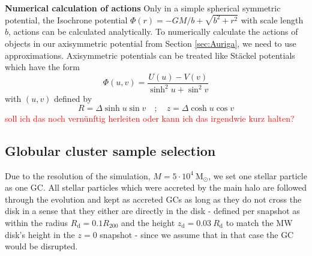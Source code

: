 \textbf{Numerical calculation of actions} Only in a simple spherical symmetric potential, the Isochrone potential $\Phi(r) = -GM/b + \sqrt{b^2+r^2}$ with scale length $b$, actions can be calculated analytically. To numerically calculate the actions of objects in our axisymmetric potential from Section \ref{sec:Auriga}, we need to use approximations. Axisymmetric potentials can be treated like St\"ackel potentials \citep{deZeeuw...Staeckel..1985} which have the form
\begin{equation}\label{eq:Stackel_pot}
    \Phi(u,v) = \frac{U(u)-V(v)}{\sinh^2u + \sin^2v}
\end{equation}
with $(u,v)$ defined by 
\begin{equation}
    R = \Delta \sinh{u} \sin{v}\quad ; \quad z = \Delta \cosh{u}\cos{v}
\end{equation}
\textcolor{red}{soll ich das noch vernünftig herleiten oder kann ich das irgendwie kurz halten?}

\subsection{Globular cluster sample selection}\label{subsec:GC_selection}
Due to the resolution of the simulation, $M = 5 \cdot 10 ^ 4\ \mathrm{M}_{\odot}$, we set one stellar particle as one \ac{GC}. All stellar particles which were accreted by the main halo are followed through the evolution and kept as accreted \acp{GC} as long as they do not cross the disk in a sense that they either are directly in the disk - defined per snapshot as within the radius $R_\mathrm{d} = 0.1  R_{200}$ and the height $z_\mathrm{d} = 0.03\ R_\mathrm{d}$ to match the \ac{MW} disk's height in the $z = 0$ snapshot - since we assume that in that case the \ac{GC} would be disrupted. 

